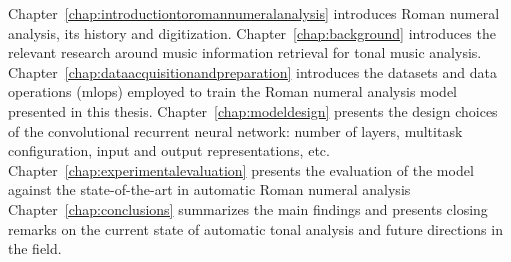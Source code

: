 

    Chapter~\ref{chap:introductiontoromannumeralanalysis} introduces Roman numeral analysis, its history and digitization.
    Chapter~\ref{chap:background} introduces the relevant research around music information retrieval for tonal music analysis.
    Chapter~\ref{chap:dataacquisitionandpreparation} introduces the datasets and data operations (mlops) employed to train the Roman numeral analysis model presented in this thesis.
    Chapter~\ref{chap:modeldesign} presents the design choices of the convolutional recurrent neural network: number of layers, multitask configuration, input and output representations, etc.
    Chapter~\ref{chap:experimentalevaluation} presents the evaluation of the model against the state-of-the-art in automatic Roman numeral analysis
    Chapter~\ref{chap:conclusions} summarizes the main findings and presents closing remarks on the current state of automatic tonal analysis and future directions in the field.
